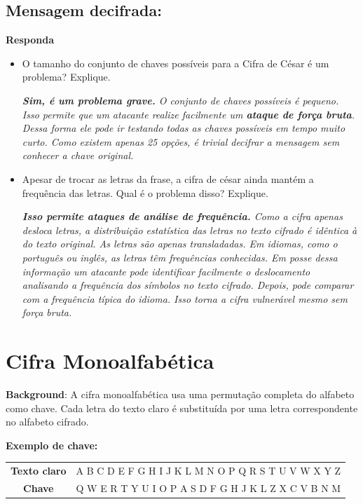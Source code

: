 \subsection*{Mensagem decifrada:}


\textbf{Responda}
\begin{itemize}
    \item O tamanho do conjunto de chaves possíveis para a Cifra de César é um problema? Explique.

\textit{    \textbf{Sim, é um problema grave.} O conjunto de chaves possíveis é pequeno. Isso permite que um atacante realize facilmente um \textbf{ataque de força bruta}. Dessa forma ele pode ir testando todas as chaves possíveis em tempo muito curto. Como existem apenas 25 opções, é trivial decifrar a mensagem sem conhecer a chave original.}

    \item Apesar de trocar as letras da frase, a cifra de césar ainda mantém a frequência das letras. Qual é o problema disso? Explique.
    
\textit{\textbf{Isso permite ataques de análise de frequência.} Como a cifra apenas desloca letras, a distribuição estatística das letras no texto cifrado é idêntica à do texto original. As letras são apenas transladadas. Em idiomas, como o português ou inglês, as letras têm frequências conhecidas. Em posse dessa informação um atacante pode identificar facilmente o deslocamento analisando a frequência dos símbolos no texto cifrado. Depois, pode comparar com a frequência típica do idioma. Isso torna a cifra vulnerável mesmo sem força bruta.}
\end{itemize}

\section{Cifra Monoalfabética}
\textbf{Background}: A cifra monoalfabética usa uma permutação completa do alfabeto como chave. Cada letra do texto claro é substituída por uma letra correspondente no alfabeto cifrado.

\textbf{Exemplo de chave:}  

\begin{tabular}{c|c}
\textbf{Texto claro} & A B C D E F G H I J K L M N O P Q R S T U V W X Y Z \\
\textbf{Chave} & Q W E R T Y U I O P A S D F G H J K L Z X C V B N M \\
\end{tabular}

